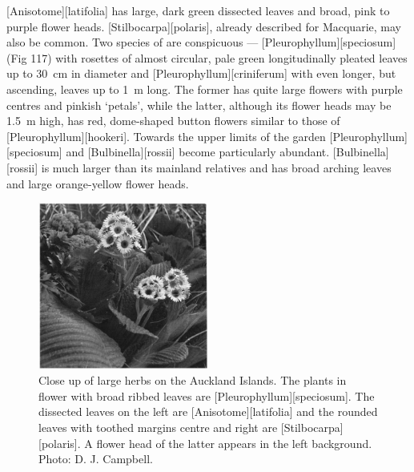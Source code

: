 [Anisotome][latifolia] has large, dark green dissected leaves and broad, pink to purple flower heads. [Stilbocarpa][polaris], already described for Macquarie, may also be common.
Two species of  are conspicuous --- [Pleurophyllum][speciosum] (Fig 117) with rosettes of almost circular, pale green longitudinally pleated leaves up to \SI{30}{\centi\metre} in diameter and [Pleurophyllum][criniferum] with even longer, but ascending, leaves up to \SI{1}{\metre} long.
The former has quite large flowers with purple centres and pinkish `petals', while the latter, although its flower heads may be \SI{1.5}{\metre} high, has red, dome-shaped button flowers similar to those of [Pleurophyllum][hookeri].
Towards the upper limits of the garden [Pleurophyllum][speciosum] and [Bulbinella][rossii] become particularly abundant. [Bulbinella][rossii] is much larger than its mainland relatives and has broad arching leaves and large orange-yellow flower heads.

\begin{figure}
	\includegraphics[width=0.5\textwidth]{graphics/figure117herbs.jpg}
	\centering
	\caption[Close up of large herbs on the Auckland Islands]{Close up of large herbs on the Auckland Islands.
	The plants in flower with broad ribbed leaves are [Pleurophyllum][speciosum].
	The dissected leaves on the left are [Anisotome][latifolia] and the rounded leaves with toothed margins centre and right are [Stilbocarpa][polaris].
	A flower head of the latter appears in the left background.
	Photo: D. J. Campbell.}%
	\label{fig:117herbs}
\end{figure}

